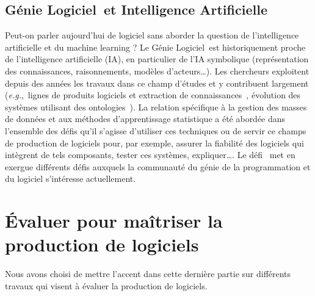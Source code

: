 \documentclass[11pt]{article}
\newcommand{\mynote}[3][black]{\textcolor{#1}{\fbox{\bfseries\sffamily\scriptsize{#2}}
{\small$\blacktriangleright$\textsf{\emph{#3}}$\blacktriangleleft$}}}
\newcommand{\TODO}[1]{\mynote[red]{TODO}{#1}}
\newcommand{\gpl}[0]{génie de la programmation et du logiciel\xspace}
\newcommand{\GL}[0]{Génie Logiciel\xspace}
\newcommand{\eg}[0]{\emph{e.g.},~}
\begin{document}




\subsection{\GL~et Intelligence Artificielle\label{ss:maintenance:IA}}
Peut-on parler aujourd'hui de logiciel sans aborder la question de l'intelligence artificielle et du machine learning ?
Le \GL~est historiquement proche de l'intelligence artificielle (IA), en particulier de l'IA symbolique (représentation des connaissances, raisonnements, modèles d'acteurs\ldots). Les chercheurs exploitent depuis des années les travaux dans ce champ d'études et y contribuent largement (\eg lignes de produits logiciels  et extraction de connaissances~\cite{Carbonnel2020}, évolution des systèmes utilisant des ontologies~\cite{Quinton2020}). La relation spécifique à la gestion des masses de données et aux méthodes d'apprentissage statistique a été abordée dans l'ensemble des défis qu'il s'agisse d'utiliser ces techniques ou de servir ce champs de production de logiciels pour, par exemple, assurer la fiabilité des logiciels qui intègrent de tels composants, tester ces systèmes, expliquer\ldots. Le défi~\cite{IA} met en exergue différents défis auxquels la communauté du \gpl s'intéresse actuellement.

\section{Évaluer pour maîtriser la production de logiciels \label{s:evaluation}}
Nous avons choisi de mettre l'accent dans cette dernière partie sur différents travaux qui visent à évaluer la production de logiciels.
\end{document}
